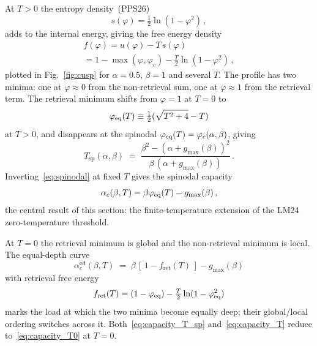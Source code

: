 \documentclass[letterpaper]{article} %
\newcommand{\Bnet}{\beta}
\newcommand{\fret}{f_{\mathrm{ret}}}
\newcommand{\gmax}{g_{\max}}
\newcommand{\ac}{\alpha_c}
\newcommand{\acEd}{\alpha_c^{\mathrm{ed}}}
\begin{document}
At $T > 0$ the entropy density~(PPS26)
\begin{equation}
    s(\varphi) = \tfrac{1}{2} \ln(1 - \varphi^2)\,,
    \label{eq:entropy}
\end{equation}
adds to the internal energy, giving the free energy density 
\begin{multline}
    f(\varphi) = u(\varphi) - T\,s(\varphi) \\= 1 -\max(\varphi, \varphi_c) - \tfrac{T}{2}\ln(1-\varphi^2)\,,
    \label{eq:free_en}
\end{multline}
plotted in  Fig.~\ref{fig:cusp} for $\alpha = 0.5$, $\Bnet = 1$ and several $T$. The profile has two minima: one at $\varphi \approx 0$ from the non-retrieval sum, one at $\varphi \approx 1$ from the retrieval term. The retrieval minimum shifts from $\varphi = 1$ at $T = 0$ to
\begin{equation}
    \varphi_{\rm eq}(T) \equiv \tfrac{1}{2}(\sqrt{T^2 + 4} - T)
    \label{eq:phi_eq}
\end{equation}
at $T > 0$, and disappears at the spinodal
$\varphi_{\rm eq}(T) = \varphi_c(\alpha, \Bnet)$, giving
\begin{equation}
    T_{\mathrm{sp}}(\alpha, \Bnet) \;=\; \frac{\Bnet^2 - (\alpha + \gmax(\Bnet))^2}
              {\Bnet\,(\alpha + \gmax(\Bnet))}\,.
    \label{eq:spinodal}
\end{equation}
Inverting~\eqref{eq:spinodal} at fixed $T$ gives the spinodal capacity
\begin{equation}
    \ac(\Bnet, T) = \Bnet \varphi_{\rm eq}(T) - g_{\max}(\Bnet)\,,
    \label{eq:capacity_T_sp}
\end{equation}
the central result of this section: the finite-temperature extension of the LM24 zero-temperature threshold.

At $T = 0$ the retrieval minimum is global and the non-retrieval minimum is local. The equal-depth curve
\begin{equation}
    \acEd(\Bnet, T) \;=\; \Bnet\,[\,1 - \fret(T)\,] - g_{\max}(\Bnet)
    \label{eq:capacity_T}
\end{equation}
with retrieval free energy
\begin{equation}
    \fret(T) = (1 - \varphi_{\rm eq}) - \tfrac{T}{2}\ln(1 - \varphi_{\rm eq}^2)
\end{equation}
marks the load at which the two minima become equally deep; their global/local ordering switches across it. Both~\eqref{eq:capacity_T_sp} and~\eqref{eq:capacity_T} reduce to~\eqref{eq:capacity_T0} at $T = 0$.
\end{document}
